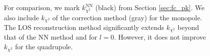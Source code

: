 \begin{figure}
\begin{center}
{                                                                                                                                                                                                                                                                         For comparison, we mark $k^\mathrm{NN}_{\chi^2}$ (black) from Section \ref{sec:fc_pk}. 
                                                                                                                                                                                                                                                                         We also include $k_{\chi^2}$ of the \cite{Gil-Marin:2014aa} correction method (gray) for 
                                                                                                                                                                                                                                                                         the monopole. The LOS reconstruction method significantly 
                                                                                                                                                                                                                                                                         extends $k_{\chi^2}$ beyond that of the NN method and \cite{Gil-Marin:2014aa} for $l=0$. 
                                                                                                                                                                                                                                                                         However, it does not improve $k_{\chi^2}$ for the quadrupole. 
                                                                                                                                                                                                                                                                         } 
                                                                                                                                                                                                                                                                         \label{fig:dlospeak_norm_resid}
                                                                                                                                                                                                                                                                         \end{center}
                                                                                                                                                                                                                                                                         \end{figure}
